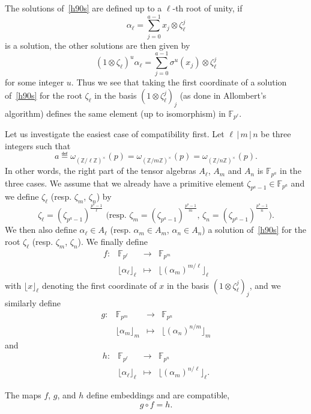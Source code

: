 \documentclass[a4paper,11pt]{article}
\begin{document}
The solutions of~\eqref{h90s} are defined up to a $\ell$-th root of unity, if 
\[
  \alpha_\ell = \sum_{j=0}^{a-1} x_j\otimes \zeta_\ell^j
\]
is a solution, the other solutions are then given by 
\[
  (1\otimes\zeta_\ell)^u\alpha_\ell = \sum_{j=0}^{a-1} \sigma^u(x_j)\otimes
  \zeta_{\ell}^j
\]
for some integer $u$. Thus we see that taking the first coordinate of a solution
of~\eqref{h90s} for the root $\zeta_\ell$ in the basis $(1\otimes\zeta_\ell^j)_j$ (as done in Allombert's
algorithm) defines the same element (up to isomorphism) in
$\mathbb{F}_{p^\ell}$.

Let us investigate the easiest case of compatibility first. Let
$\ell\,|\,m\,|\,n$ be three integers such that
\[
 a \eqdef \omega_{(\mathbb{Z}/\ell\mathbb{Z})^\times}(p) =
  \omega_{(\mathbb{Z}/m\mathbb{Z})^\times}(p) =
  \omega_{(\mathbb{Z}/n\mathbb{Z})^\times}(p).
\]
In other words, the right part of the tensor algebras $A_\ell$, $A_m$ and $A_n$
is $\mathbb{F}_{p^a}$ in the three cases. We assume that we already have a
primitive element $\zeta_{p^a-1}\in\mathbb{F}_{p^a}$ and we define $\zeta_\ell$
(resp. $\zeta_m$, $\zeta_n$) by 
\[
  \zeta_\ell = (\zeta_{p^a-1})^\frac{p^a-1}{\ell}\text{ (resp. }\zeta_m =
  (\zeta_{p^a-1})^\frac{p^a-1}{m},\,\zeta_n =
  (\zeta_{p^a-1})^\frac{p^a-1}{n}  \text{)}.
\]
We then also define $\alpha_\ell\in A_\ell$ (resp. $\alpha_m\in A_m$,
$\alpha_n\in A_n$) a solution
of~\eqref{h90s} for the root $\zeta_\ell$ (resp. $\zeta_m$, $\zeta_n$).
We finally define 
\[
\begin{array}{cccc}
  f: & \mathbb{F}_{p^\ell} & \to &\mathbb{F}_{p^m} \\
  & \lfloor \alpha_{\ell}\rfloor_\ell & \mapsto & \lfloor
(\alpha_{m})^{m/\ell}\rfloor_\ell
\end{array}
\]
with $\lfloor x \rfloor_\ell$ denoting the first coordinate of $x$ in the basis
$(1\otimes\zeta_{\ell}^j)_j$, and we similarly define
\[
\begin{array}{cccc}
  g: & \mathbb{F}_{p^m} & \to &\mathbb{F}_{p^n} \\
  & \lfloor \alpha_{m}\rfloor_m & \mapsto & \lfloor
(\alpha_{n})^{n/m}\rfloor_m
\end{array}
\]
and
\[
\begin{array}{cccc}
  h: & \mathbb{F}_{p^\ell} & \to &\mathbb{F}_{p^n} \\
  & \lfloor \alpha_{\ell}\rfloor_\ell & \mapsto & \lfloor
(\alpha_{m})^{n/\ell}\rfloor_\ell.
\end{array}
\]
\begin{prop}
  The maps $f$, $g$, and $h$ define embeddings and are compatible, \ie
  \[
    g\circ f = h.
  \]
\end{prop}
\end{document}
